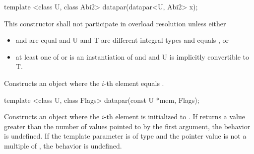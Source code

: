 
\begin{itemdecl}
template <class U, class Abi2> datapar(datapar<U, Abi2> x);
\end{itemdecl}
\begin{itemdescr}
  \pnum\remarks This constructor shall not participate in overload resolution unless either
  \begin{itemize}
    \item {} and  are equal and
      \type U and \type T are different integral types and
       equals , or
    \item at least one of  or  is an instantiation of \fixedsizescoped and  and \type U is implicitly convertible to \type T.
  \end{itemize}
  \pnum\effects Constructs an object where the $i$-th element equals  \foralli.
\end{itemdescr}

\begin{itemdecl}
template <class U, class Flags> datapar(const U *mem, Flags);
\end{itemdecl}
\begin{itemdescr}
  \pnum\effects Constructs an object where the $i$-th element is initialized to  \foralli.
  \pnum\remarks If  returns a value greater than the number of values pointed to by the first argument, the behavior is undefined.
  \pnum\remarks If the  template parameter is of type  and the pointer value is not a multiple of , the behavior is undefined.
\end{itemdescr}

